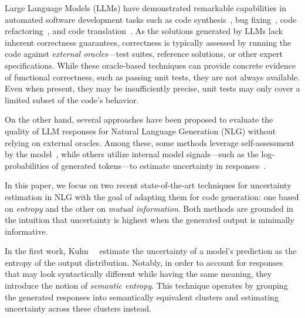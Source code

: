 Large Language Models (LLMs) have demonstrated remarkable capabilities in automated software development tasks such as code synthesis~\cite{synthesis1,synthesis2}, bug fixing~\cite{AutoCodeRoverPre,AutoCodeRover}, code refactoring~\cite{coderefactoring1,coderefactoring2}, and code translation~\cite{codetranslation1,codetranslation2,codetranslation3}. 
As the solutions generated by LLMs lack inherent correctness guarantees, correctness is typically assessed by running the code against \emph{external oracles}---test suites, reference solutions, or other expert specifications. 
While these oracle-based techniques can provide concrete evidence of functional correctness, such as passing unit tests, they are not always available. 
Even when present, they may be insufficiently precise, \eg unit tests may only cover a limited subset of the code's behavior. 


On the other hand, several approaches have been proposed to evaluate the quality of LLM responses for Natural Language Generation (NLG) without relying on external oracles. 
Among these, some methods leverage self-assessment by the model~\cite{DBLP:conf/icml/0001TDM24,DBLP:conf/acl/Xia0WCZ24,DBLP:journals/tmlr/LinHE22,DBLP:journals/corr/abs-2207-05221}, while others utilize internal model signals---such as the log-probabilities of generated tokens---to estimate uncertainty in responses~\cite{abbasi2024believe,farquhar2024detecting,kuhnsemantic,DBLP:conf/iclr/MalininG21}.

In this paper, we focus on two recent state-of-the-art techniques for uncertainty estimation in NLG with the goal of adapting them for code generation: one based on \emph{entropy}\cite{farquhar2024detecting,kuhnsemantic} and the other on \emph{mutual information}\cite{abbasi2024believe}. 
Both methods are grounded in the intuition that uncertainty is highest when the generated output is minimally informative.

In the first work, Kuhn~\etal~\cite{kuhnsemantic} estimate the uncertainty of a model's prediction as the entropy of the output distribution. 
Notably, in order to account for responses that may look syntactically different while having the same meaning, they introduce the notion of \emph{semantic entropy}.
This technique operates by grouping the generated responses into semantically equivalent clusters and estimating uncertainty across these clusters instead.

